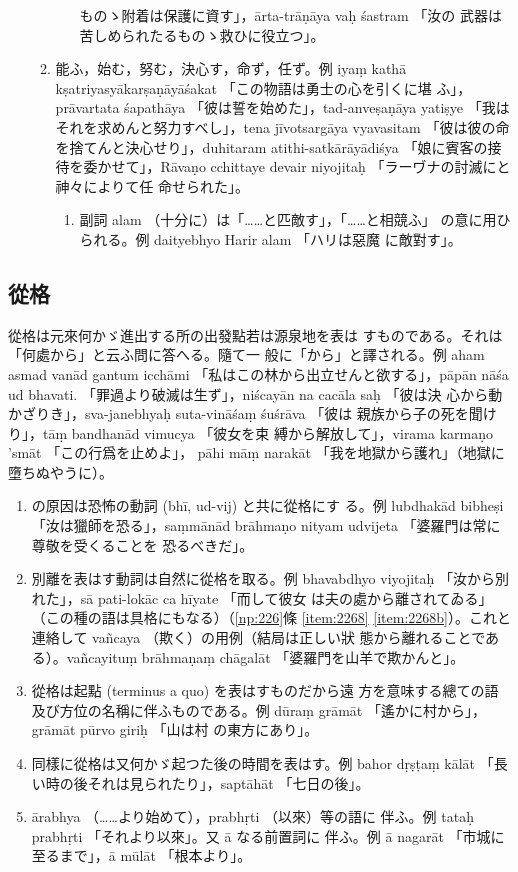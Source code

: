 \begin{enumerate}[label=(\Alph*)]
\begin{enumerate}[label=(\arabic*)]
\begin{enumerate}[label=(\alph*)]
ものゝ附着は保護に資す」，ārta-trāṇāya vaḥ śastram 「汝の
武器は苦しめられたるものゝ救ひに役立つ」。
\end{enumerate}
\item 能ふ，始む，努む，決心す，命ず，任ず。例 iyaṃ kathā
kṣatriyasyākarṣaṇāyāśakat 「この物語は勇士の心を引くに堪
ふ」，prāvartata śapathāya 「彼は誓を始めた」，tad-anveṣaṇāya
yatiṣye 「我はそれを求めんと努力すべし」，tena jīvotsargāya
vyavasitam 「彼は彼の命を捨てんと決心せり」，duhitaram
atithi-satkārāyādiśya 「娘に賓客の接待を委かせて」，Rāvaṇo\-%
cchittaye devair niyojitaḥ 「ラーヷナの討滅にと神々によりて任
命せられた」。
\begin{enumerate}[label=(\alph*)]
\item 副詞 alam （十分に）は「……と匹敵す」，「……と相競ふ」
の意に用ひられる。例 daityebhyo Harir alam 「ハリは惡魔
に敵對す」。
\end{enumerate}
\end{enumerate}
\end{enumerate}

\subsection{從格}
\numberParagraph
從格は元來何かゞ進出する所の出發點若は源泉地を表は
すものである。それは「何處から」と云ふ問に答へる。隨て一
般に「から」と譯される。例 aham asmad vanād gantum
icchāmi 「私はこの林から出立せんと欲する」，pāpān nāśa ud\-%
bhavati. 「罪過より破滅は生ず」，niścayān na cacāla saḥ 「彼は決
心から動かざりき」，sva-janebhyaḥ suta-vināśaṃ śuśrāva 「彼は
親族から子の死を聞けり」，tāṃ bandhanād vimucya 「彼女を束
縛から解放して」，virama karmaṇo 'smāt 「この行爲を止めよ」，
pāhi māṃ narakāt 「我を地獄から護れ」（地獄に墮ちぬやうに）。
\begin{enumerate}[label=(\alph*)]
\item {}の原因は恐怖の動詞 (bhī, ud-vij) と共に從格にす
る。例 lubdhakād bibheṣi 「汝は獵師を恐る」，saṃmānād
brāhmaṇo nityam udvijeta 「婆羅門は常に尊敬を受くることを
恐るべきだ」。
\item 別離を表はす動詞は自然に從格を取る。例 bhavabdhyo
viyojitaḥ 「汝から別れた」，sā pati-lokāc ca hīyate 「而して彼女
は夫の處から離されてゐる」（この種の語は具格にもなる）（\ref{np:226}條
\ref{item:2268} \ref{item:2268b}）。これと連絡して vañcaya （欺く）の用例（結局は正しい狀
態から離れることである）。vañcayituṃ brāhmaṇaṃ chāgalāt
「婆羅門を山羊で欺かんと」。
\item 從格は起點 (terminus a quo) を表はすものだから遠
方を意味する總ての語及び方位の名稱に伴ふものである。例
dūraṃ grāmāt 「遙かに村から」，grāmāt pūrvo giriḥ 「山は村
の東方にあり」。
\item 同樣に從格は又何かゞ起つた後の時間を表はす。例
bahor dṛṣṭaṃ kālāt 「長い時の後それは見られたり」，saptāhāt
「七日の後」。
\item ārabhya （……より始めて），prabhṛti （以來）等の語に
伴ふ。例 tataḥ prabhṛti 「それより以來」。又 ā なる前置詞に
伴ふ。例 ā nagarāt 「市城に至るまで」，ā mūlāt 「根本より」。
\end{enumerate}

